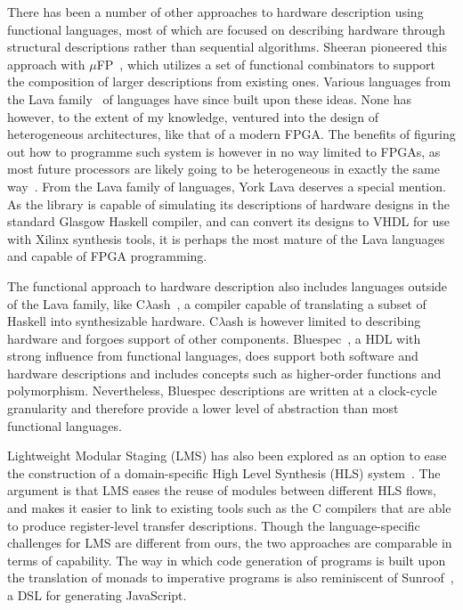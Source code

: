 \documentclass[../paper.tex]{subfiles}
\begin{document}
There has been a number of other approaches to hardware description using functional languages, most of which are focused on describing hardware through structural descriptions rather than sequential algorithms. Sheeran pioneered this approach with $\mu$FP~\cite{sheeran1984}, which utilizes a set of functional combinators to support the composition of larger descriptions from existing ones. Various languages from the Lava family~\cite{bjesse1998, gill2010} of languages have since built upon these ideas. None has however, to the extent of my knowledge, ventured into the design of heterogeneous architectures, like that of a modern FPGA. The benefits of figuring out how to programme such system is however in no way limited to FPGAs, as most future processors are likely going to be heterogeneous in exactly the same way~\cite{sheeran2015}. From the Lava family of languages, York Lava deserves a special mention. As the library is capable of simulating its descriptions of hardware designs in the standard Glasgow Haskell compiler, and can convert its designs to VHDL for use with Xilinx synthesis tools, it is perhaps the most mature of the Lava languages and capable of FPGA programming.

The functional approach to hardware description also includes languages outside of the Lava family, like C$\lambda$ash~\cite{baaij2010}, a compiler capable of translating a subset of Haskell into synthesizable hardware. C$\lambda$ash is however limited to describing hardware and forgoes support of other components. Bluespec~\cite{nikhil2004}, a HDL with strong influence from functional languages, does support both software and hardware descriptions and includes concepts such as higher-order functions and polymorphism. Nevertheless, Bluespec descriptions are written at a clock-cycle granularity and therefore provide a lower level of abstraction than most functional languages. %

Lightweight Modular Staging (LMS) has also been explored as an option to ease the construction of a domain-specific High Level Synthesis (HLS) system~\cite{george2013}. The argument is that LMS eases the reuse of modules between different HLS flows, and makes it easier to link to existing tools such as the C compilers that are able to produce register-level transfer descriptions. Though the language-specific challenges for LMS are different from ours, the two approaches are comparable in terms of capability. The way in which code generation of programs is built upon the translation of monads to imperative programs is also reminiscent of Sunroof~\cite{gill2014}, a DSL for generating JavaScript.
\end{document}
